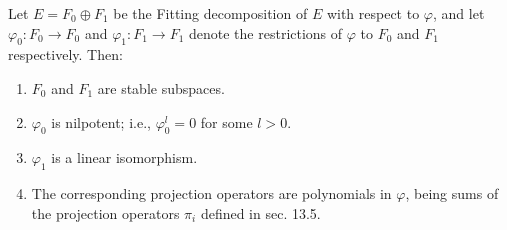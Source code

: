 Let $E = F_0 \oplus F_1$ be the Fitting decomposition of $E$ with respect to $\varphi$, and let $\varphi_0: F_0 \to F_0$ and $\varphi_1: F_1 \to F_1$ denote the restrictions of $\varphi$ to $F_0$ and $F_1$ respectively. Then:
\begin{enumerate}
\item $F_0$ and $F_1$ are stable subspaces.
\item $\varphi_0$ is nilpotent; i.e., $\varphi_0^l = 0$ for some $l > 0$.
\item $\varphi_1$ is a linear isomorphism.
\item The corresponding projection operators are polynomials in $\varphi$, being sums of the projection operators $\pi_i$ defined in sec. 13.5.
\end{enumerate}
